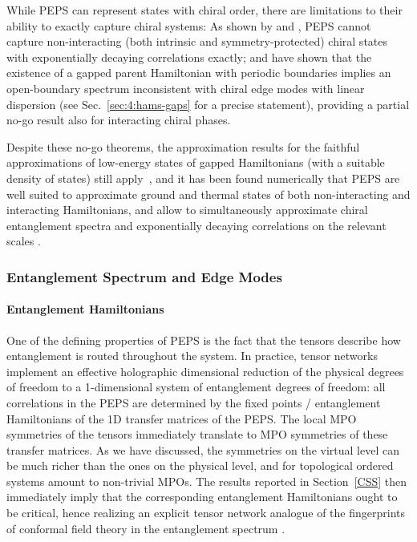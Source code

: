 \documentclass[rmp,aps,reprint,superscriptaddress,nobalancelastpage]{revtex4-1}
\begin{document}
    While PEPS can represent states with chiral order, there are limitations to their ability to exactly capture chiral systems: As shown by \citet{dubail:chiral-fpeps} and \citet{read:chiral-peps-wannier-functions}, PEPS cannot capture non-interacting
    (both intrinsic and symmetry-protected) chiral states with exponentially decaying correlations exactly; and \citet{mozgunov:knabe-bound-chiral} have shown that the existence of a gapped parent Hamiltonian with periodic boundaries implies an open-boundary spectrum inconsistent with chiral edge modes with linear dispersion (see Sec.~\ref{sec:4:hams-gaps} for a precise statement), providing a partial no-go result also for interacting chiral phases.

    Despite these no-go theorems, the approximation results for the faithful approximations of low-energy states of gapped Hamiltonians (with a suitable density of states) still apply~\cite{hastings:locally,molnar:thermal-peps}, and it has been found numerically that PEPS are well suited to approximate ground and thermal states of both non-interacting
    and interacting Hamiltonians, and allow to simultaneously approximate chiral entanglement spectra and exponentially decaying correlations on the relevant scales   \cite{wahl:chiral-fPEPS,poilblanc:chiral_hafm_squarelattice,chen:peps_su2_2_csl,chen:su3_peps_csl}.








    \subsubsection{Entanglement Spectrum and Edge Modes \label{secESEM}}

    \paragraph{Entanglement Hamiltonians}
    One of the defining properties of PEPS is the fact that the tensors describe how entanglement is routed throughout the system. In practice, tensor networks implement an effective holographic dimensional reduction of the physical degrees of freedom to a 1-dimensional system of entanglement degrees of freedom: all correlations in the PEPS are determined by the fixed points / entanglement Hamiltonians of the 1D transfer matrices of the PEPS. The local MPO symmetries of the tensors immediately translate to MPO symmetries of these transfer matrices. As we have discussed, the symmetries on the virtual level can be much richer than the ones on the physical level, and for topological ordered systems amount to non-trivial MPOs. The results reported in Section~\ref{CSS} then immediately imply that the corresponding entanglement Hamiltonians ought to be critical, hence realizing an explicit tensor network analogue of the fingerprints of conformal field theory in the entanglement spectrum \cite{dubail:entanglement-spectrum,qi:bulk-boundary-duality}.
\end{document}
